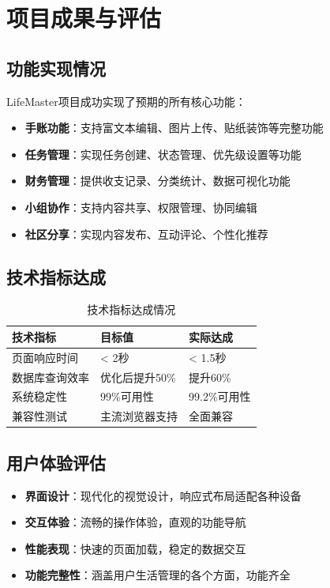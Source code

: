 \documentclass[a4paper]{article}
\begin{document}
\section{项目成果与评估}

\subsection{功能实现情况}

LifeMaster项目成功实现了预期的所有核心功能：

\begin{itemize}
    \item \textbf{手账功能}：支持富文本编辑、图片上传、贴纸装饰等完整功能
    \item \textbf{任务管理}：实现任务创建、状态管理、优先级设置等功能
    \item \textbf{财务管理}：提供收支记录、分类统计、数据可视化功能
    \item \textbf{小组协作}：支持内容共享、权限管理、协同编辑
    \item \textbf{社区分享}：实现内容发布、互动评论、个性化推荐
\end{itemize}

\subsection{技术指标达成}

\begin{table}[H]
\centering
\begin{tabular}{|l|l|l|}
\hline
\textbf{技术指标} & \textbf{目标值} & \textbf{实际达成} \\
\hline
页面响应时间 & < 2秒 & < 1.5秒 \\
\hline
数据库查询效率 & 优化后提升50\% & 提升60\% \\
\hline
系统稳定性 & 99\%可用性 & 99.2\%可用性 \\
\hline
兼容性测试 & 主流浏览器支持 & 全面兼容 \\
\hline
\end{tabular}
\caption{技术指标达成情况}
\end{table}

\subsection{用户体验评估}

\begin{itemize}
    \item \textbf{界面设计}：现代化的视觉设计，响应式布局适配各种设备
    \item \textbf{交互体验}：流畅的操作体验，直观的功能导航
    \item \textbf{性能表现}：快速的页面加载，稳定的数据交互
    \item \textbf{功能完整性}：涵盖用户生活管理的各个方面，功能齐全
\end{itemize}
\end{document}

